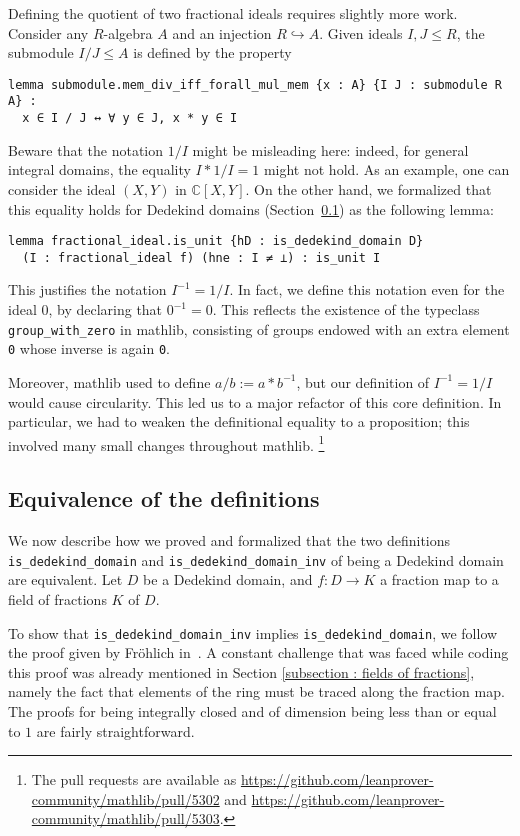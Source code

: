 \documentclass[a4paper,USenglish,cleveref, autoref, thm-restate]{lipics-v2021}
\newcommand{\C}{\mathbb{C}}
\newcommand{\lean}[1]{\texttt{#1}\xspace}
\newcommand{\mathlib}{\textsf{mathlib}\xspace}
\begin{document}
Defining the quotient of two fractional ideals requires slightly more work. Consider any $R$-algebra $A$ and an injection $R\hookrightarrow A$. Given ideals $I,J\le R$, the submodule $I / J\le A$
is defined by the property
\pagebreak[3] %
\begin{lstlisting}
lemma submodule.mem_div_iff_forall_mul_mem {x : A} {I J : submodule R A} :
  x ∈ I / J ↔ ∀ y ∈ J, x * y ∈ I
\end{lstlisting}
Beware that the notation $1/I$ might be misleading here: indeed, for general integral domains, the equality $I\ast 1/I=1$ might not hold. As an example, one can consider the ideal $(X,Y)$ in $\C[X,Y]$.
On the other hand, we formalized that this equality holds for Dedekind domains (Section~\ref{sec:equivalence}) as the following lemma:
\begin{lstlisting}
lemma fractional_ideal.is_unit {hD : is_dedekind_domain D}
  (I : fractional_ideal f) (hne : I ≠ ⊥) : is_unit I
\end{lstlisting}
This justifies the notation $I^{-1}=1/I$. In fact, we define this notation even for the ideal $0$, by declaring that $0^{-1}=0$. This reflects the existence of the typeclass \lean{group\_with\_zero} in \mathlib, consisting of groups endowed with an extra element \lean{0} whose inverse is again \lean{0}.

Moreover, \mathlib used to define \lean{$a / b := a * b^{-1}$}, but our definition of $I^{-1} = 1 / I$ would cause circularity. This led us to a major refactor of this core definition. In particular, we had to weaken the definitional equality to a proposition; this involved many small changes throughout \mathlib.%
\footnote{The pull requests are available as \url{https://github.com/leanprover-community/mathlib/pull/5302} and \url{https://github.com/leanprover-community/mathlib/pull/5303}.}

\subsection{Equivalence of the definitions} \label{sec:equivalence}
We now describe how we proved and formalized that the two definitions \lean{is\_dedekind\_domain} and \lean{is\_dedekind\_domain\_inv} of being a Dedekind domain are equivalent. Let $D$ be a Dedekind domain, and $f\colon D\to K$ a fraction map to a field of fractions $K$ of $D$.

To show that \lean{is\_dedekind\_domain\_inv} implies \lean{is\_dedekind\_domain}, we follow the proof given by Fr\"ohlich in~\cite[Chapter 1, \S~2, ~Proposition 1.2.1]{frohlich}. A constant challenge that was faced while coding this proof was already mentioned in Section \ref{subsection : fields of fractions}, namely the fact that elements of the ring must be traced along the fraction map.
The proofs for being integrally closed and of dimension being less than or equal to $1$ are fairly straightforward.
\end{document}
